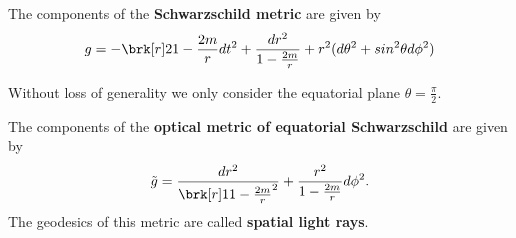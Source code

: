 \begin{definition}[]\label{}
The components of the \textbf{Schwarzschild metric} are given by
\begin{equation}\label{}
g = -\brk[r]2{1-\frac{2m}{r}} dt^2 + \frac{dr^2}{1-\frac{2m}{r}} + r^2(d\theta^2 + sin^2\theta d\phi^2)
\end{equation}

\end{definition}

Without loss of generality we only consider the equatorial plane $\theta=\frac{\pi}{2}$.
\begin{definition}[]\label{def:schwarz-fermat}
The components of the \textbf{optical metric of equatorial Schwarzschild} are given by
\begin{equation}\label{}
\fermat = \frac{dr^2}{\brk[r]1{1 - \frac{2m}{r}}^2} + \frac{r^2}{1 - \frac{2m}{r}} d\phi^2.
\end{equation}
The geodesics of this metric are called \textbf{spatial light rays}.
\end{definition}

